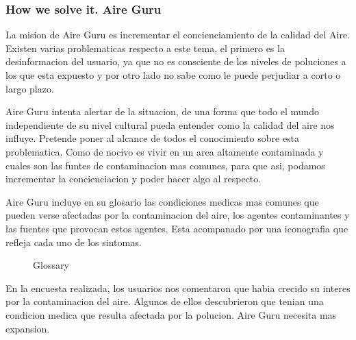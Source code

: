 \subsubsection{How we solve it. Aire Guru} 
La mision de Aire Guru es incrementar el concienciamiento de la calidad del Aire. 
Existen varias problematicas respecto a este tema, el primero es la desinformacion del usuario, ya que no es 
consciente de los niveles de poluciones a los que esta expuesto y por otro lado no sabe como le puede perjudiar
a corto o largo plazo.

Aire Guru intenta alertar de la situacion, de una forma que todo el mundo independiente de su nivel cultural 
pueda entender como la calidad del aire nos influye. Pretende poner al alcance de todos el conocimiento sobre
esta problematica. Como de nocivo es vivir en un area altamente contaminada y cuales son las funtes de contaminacion
mas comunes, para que asi, podamos incrementar la concienciacion y poder hacer algo al respecto.


Aire Guru incluye en su glosario las condiciones medicas mas comunes que pueden verse afectadas por la contaminacion
del aire, los agentes contaminantes y las fuentes que provocan estos agentes. Esta acompanado por una iconografia
que refleja cada uno de los sintomas.\\


 \begin{figure}[ht]
    \centering
    \hfill
  
  \caption{Glossary}
    \end{figure}


\begin{itemize}
    \done En la encuesta realizada, los usuarios nos comentaron que habia crecido su interes por la contaminacion
    del aire. Algunos de ellos descubrieron que tenian una condicion medica que resulta afectada por la polucion.
    \crossed Aire Guru necesita mas expansion.
    
\end{itemize}
\newpage